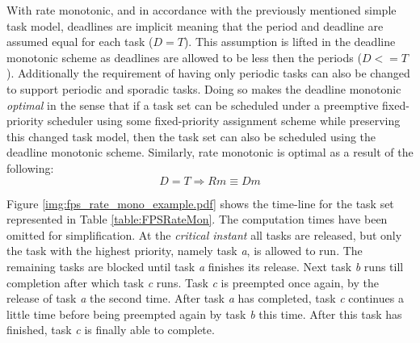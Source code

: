 With rate monotonic, and in accordance with the previously mentioned simple task model, deadlines are implicit meaning that the period and deadline are assumed equal for each task ($D = T$). This assumption is lifted in the deadline monotonic scheme as deadlines are allowed to be less then the periods ($D <= T$). Additionally the requirement of having only periodic tasks can also be changed to support periodic and sporadic tasks. Doing so makes the deadline monotonic \textit{optimal} in the sense that if a task set can be scheduled under a preemptive fixed-priority scheduler using some fixed-priority assignment scheme while preserving this changed task model, then the task set can also be scheduled using the deadline monotonic scheme. Similarly, rate monotonic is optimal as a result of the following:
\begin{equation}
	D = T \Rightarrow Rm \equiv Dm 
\end{equation}

Figure \ref{img:fps_rate_mono_example.pdf} shows the time-line for the task set represented in Table \ref{table:FPSRateMon}. The computation times have been omitted for simplification. At the \textit{critical instant} all tasks are released, but only the task with the highest priority, namely task \textit{a}, is allowed to run. The remaining tasks are blocked until task \textit{a} finishes its release. Next task \textit{b} runs till completion after which task \textit{c} runs. Task \textit{c} is preempted once again, by the release of task \textit{a} the second time. After task \textit{a} has completed, task \textit{c} continues a little time before being preempted again by task \textit{b} this time. After this task has finished, task \textit{c} is finally able to complete.



